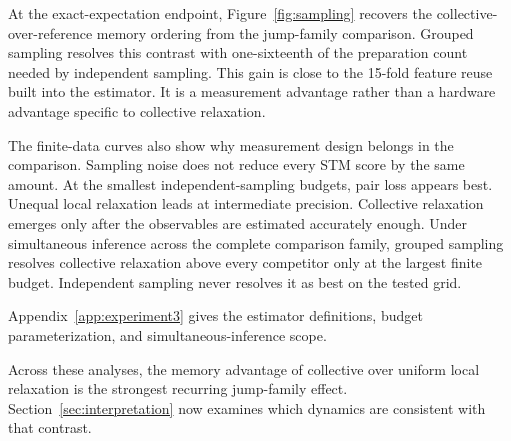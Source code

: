 At the exact-expectation endpoint, Figure~\ref{fig:sampling} recovers the
collective-over-reference memory ordering from the jump-family comparison.
Grouped sampling resolves this contrast with one-sixteenth of the preparation
count needed by independent sampling. This gain is close to the 15-fold
feature reuse built into the estimator. It is a measurement advantage rather
than a hardware advantage specific to collective relaxation.

The finite-data curves also show why measurement design belongs in the
comparison. Sampling noise does not reduce every STM score by the same amount.
At the smallest independent-sampling budgets, pair loss appears best. Unequal
local relaxation leads at intermediate precision. Collective relaxation
emerges only after the observables are estimated accurately enough. Under
simultaneous inference across the complete comparison family, grouped sampling
resolves collective relaxation above every competitor only at the largest
finite budget. Independent sampling never resolves it as best on the tested
grid.

Appendix~\ref{app:experiment3} gives the estimator definitions, budget
parameterization, and simultaneous-inference scope.
\FloatBarrier

Across these analyses, the memory advantage of collective over uniform local
relaxation is the strongest recurring jump-family effect.
Section~\ref{sec:interpretation} now examines which dynamics are consistent
with that contrast.
